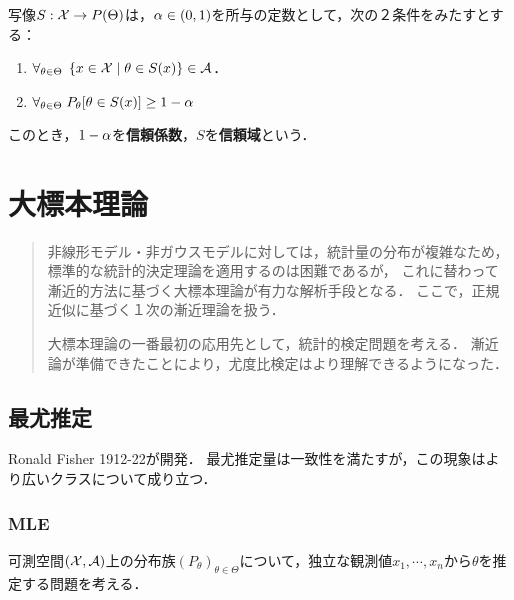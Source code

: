 \documentclass[uplatex,dvipdfmx]{jsreport}
\begin{document}
\begin{definition}
    写像$S:\mathcal{X}\to P(\Theta)$は，$\alpha\in(0,1)$を所与の定数として，次の２条件をみたすとする：
    \begin{enumerate}
        \item $\forall_{\theta\in\Theta}\;\left\{x\in\mathcal{X}\mid \theta\in S(x)\right\}\in\mathcal{A}$．
        \item $\forall_{\theta\in\Theta}\;P_\theta[\theta\in S(x)]\ge1-\alpha$
    \end{enumerate}
    このとき，$1-\alpha$を\textbf{信頼係数}，$S$を\textbf{信頼域}という．
\end{definition}

\chapter{大標本理論}

\begin{quotation}
    非線形モデル・非ガウスモデルに対しては，統計量の分布が複雑なため，標準的な統計的決定理論を適用するのは困難であるが，
    これに替わって漸近的方法に基づく大標本理論が有力な解析手段となる．
    ここで，正規近似に基づく１次の漸近理論を扱う．

    大標本理論の一番最初の応用先として，統計的検定問題を考える．
    漸近論が準備できたことにより，尤度比検定はより理解できるようになった．
\end{quotation}

\section{最尤推定}

\begin{tcolorbox}[colframe=ForestGreen, colback=ForestGreen!10!white,breakable,colbacktitle=ForestGreen!40!white,coltitle=black,fonttitle=\bfseries\sffamily,
title=]
    Ronald Fisher 1912-22が開発．
    最尤推定量は一致性を満たすが，この現象はより広いクラスについて成り立つ．
\end{tcolorbox}

\subsection{MLE}

\begin{problem}
    可測空間$(\mathcal{X},\mathcal{A})$上の分布族$(P_\theta)_{\theta\in\Theta}$について，独立な観測値$x_1,\cdots,x_n$から$\theta$を推定する問題を考える．
\end{problem}
\end{document}
